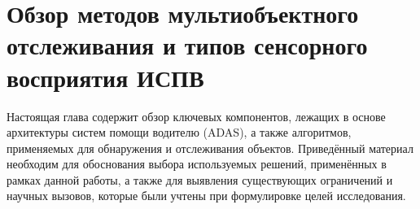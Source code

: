 \chapter{Обзор методов мультиобъектного отслеживания и  типов сенсорного восприятия ИСПВ}

Настоящая глава содержит обзор ключевых компонентов, лежащих в основе архитектуры систем помощи водителю (ADAS), а также алгоритмов, применяемых для обнаружения и отслеживания объектов. Приведённый материал необходим для обоснования выбора используемых решений, применённых в рамках данной работы, а также для выявления существующих ограничений и научных вызовов, которые были учтены при формулировке целей исследования.






